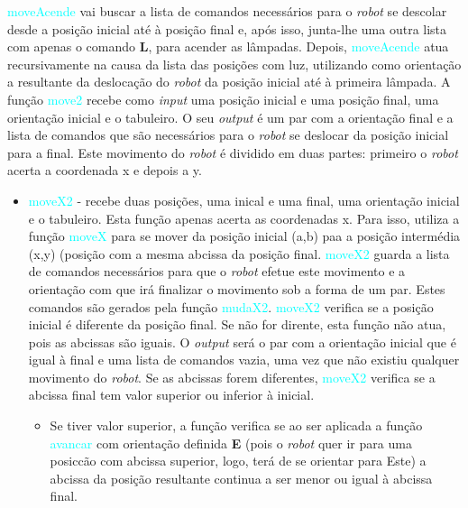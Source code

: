 \documentclass[12pt,a4paper]{article}
\begin{document}
\textsf{\textcolor{cyan}{moveAcende} vai buscar a lista de comandos necessários para o \textit{robot} se descolar desde a posi\c{c}ão inicial até à posi\c{c}ão final e, após isso, junta-lhe uma outra lista com apenas o comando \textbf{L}, para acender as lâmpadas. Depois, \textcolor{cyan}{moveAcende} atua recursivamente na causa da lista das posi\c{c}ões com luz, utilizando como orienta\c{c}ão a resultante da desloca\c{c}ão do \textit{robot} da posi\c{c}ão inicial até à primeira lâmpada. A fun\c{c}ão \textcolor{cyan}{move2} recebe como \textit{input} uma posi\c{c}ão inicial e uma posi\c{c}ão final, uma orienta\c{c}ão inicial e o tabuleiro. O seu \textit{output} é um par com a orienta\c{c}ão final e a lista de comandos que são necessários para o \textit{robot} se deslocar da posi\c{c}ão inicial para a final. Este movimento do \textit{robot} é dividido em duas partes: primeiro o \textit{robot} acerta a coordenada x e depois a y.} \begin{itemize}
\item \textsf{ \textcolor{cyan}{moveX2} - 
recebe duas posi\c{c}ões, uma inical e uma final, uma orienta\c{c}ão inicial e o tabuleiro. Esta fun\c{c}ão apenas 
acerta as coordenadas x. Para isso, utiliza a fun\c{c}ão \textcolor{cyan}{moveX} para se mover da posi\c{c}ão inicial (a,b) paa a posi\c{c}ão intermédia (x,y) (posi\c{c}ão com a mesma abcissa da posi\c{c}ão final. \textcolor{cyan}{moveX2} guarda a lista de comandos necessários para que o \textit{robot} efetue este movimento e a orienta\c{c}ão com que irá finalizar o movimento sob a forma de um par. Estes comandos são gerados pela fun\c{c}ão \textcolor{cyan}{mudaX2}.} 
\newline \indent \textsf{ \textcolor{cyan}{moveX2} verifica se a posi\c{c}ão inicial é diferente da posi\c{c}ão final. Se não for dirente, esta fun\c{c}ão não atua, pois as abcissas são iguais. O \textit{output} será o par com a orienta\c{c}ão inicial que é igual à final e uma lista de comandos vazia, uma vez que não existiu qualquer movimento do \textit{robot}.}
\newline\textsf{\indent Se as abcissas forem diferentes, \textcolor{cyan}{moveX2} verifica se a abcissa final tem valor superior ou inferior à inicial.} \begin{itemize}
\item \textsf{ Se tiver valor superior, a fun\c{c}ão verifica se ao ser aplicada a fun\c{c}ão \textcolor{cyan}{avancar} com orienta\c{c}ão definida \textbf{E} (pois o \textit{robot} quer ir para uma posic{c}ão com abcissa superior, logo, terá de se orientar para Este) a abcissa da posi\c{c}ão resultante continua a ser menor ou igual à abcissa final.} \begin{itemize}

\end{itemize}
\end{itemize}
\end{itemize}
\end{document}
